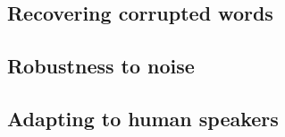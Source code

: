 \subsection{Recovering corrupted words}
\label{sec:word-relearning}

\subsection{Robustness to noise}
\label{sec:noise-robustness}

\subsection{Adapting to human speakers}
\label{sec:human-data}